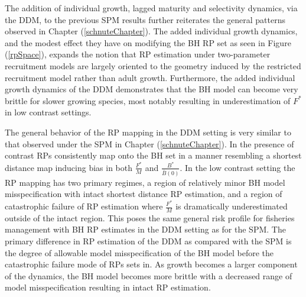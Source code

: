 %
The addition of individual growth, lagged maturity and selectivity dynamics, via the DDM, to the 
previous SPM results %
further reiterates the general patterns observed in Chapter (\ref{schnuteChapter}). 
The added individual growth dynamics, and the modest effect they have on modifying the BH RP set as seen 
in Figure (\ref{rpSpace}), expands the notion that RP estimation under %
two-parameter recruitment models are largely oriented to the geometry induced by the 
restricted recruitment model rather than adult growth. Furthermore, the added individual 
growth dynamics of the DDM demonstrates that the BH model can become very brittle 
for slower growing species, most notably resulting in underestimation of $F^*$ in low contrast settings.


%
The general behavior of the RP mapping in the DDM setting is very similar to 
that observed under the SPM in Chapter (\ref{schnuteChapter}). In the presence of contrast 
RPs consistently map onto the BH set in a manner resembling a shortest distance map inducing bias in both $\frac{F^*}{M}$ and $\frac{B^*}{\bar B(0)}$.
In the low contrast setting the RP mapping has two primary regimes, a region of relatively 
minor BH model misspecification with intact shortest distance RP estimation, and a region of %
catastrophic failure of RP estimation where $\frac{F^*}{M}$ is dramatically underestimated 
outside of the intact region. This poses the same general risk profile for fisheries 
management with BH RP estimates in the DDM setting as for the SPM. The primary difference 
in RP estimation of the DDM as compared with the SPM is the degree of allowable model 
misspecification of the BH model before the catastrophic failure mode of RPs sets in. 
As growth becomes a larger component of the dynamics, the BH model becomes more brittle 
with a decreased range of model misspecification resulting in intact RP estimation.
 
